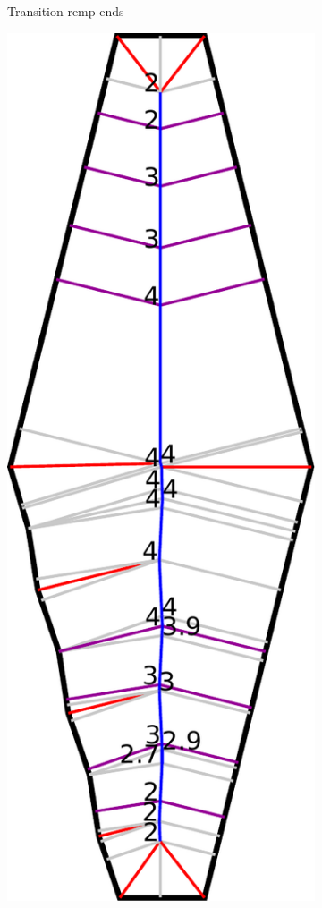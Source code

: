 \begin{figure}
\begin{subfigure}{\figwidth}
\caption{Transition remp ends}\label{beading_transitioning_filtering__transition_ends}
\end{subfigure}
\begin{subfigure}{\figwidth}
\includegraphics[width=\columnwidth]{sources/method/beading_transitioning_filtering__transitions_applied.pdf}

\end{subfigure}
\end{figure}
